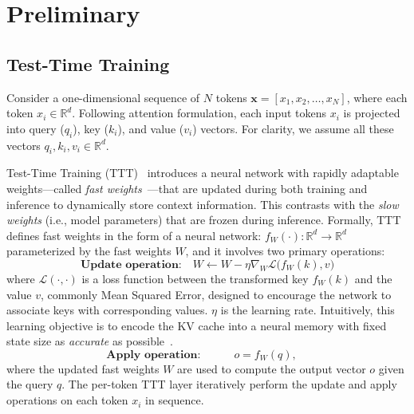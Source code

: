 \section{Preliminary} \label{sec:related}




\subsection{Test-Time Training}

Consider a one-dimensional sequence of $N$ tokens
$\mathbf{x} = [x_1, x_2, \dots, x_N]$, where each token $x_i \in \mathbb{R}^d$. 
Following attention formulation, 
each input tokens $x_i$ is projected into query ($q_i$), key ($k_i$), and value ($v_i$) vectors. 
For clarity, we assume all these vectors $q_i, k_i, v_i \in \mathbb{R}^d$.

Test-Time Training (TTT)~\cite{sun2024learning} introduces a neural network with rapidly adaptable weights---called \textit{fast weights}~\cite{schlag2021linear}---that are updated during 
both training and inference to dynamically store context information. 
This contrasts with the \textit{slow weights} (i.e., model parameters) that are frozen during inference.
Formally, TTT defines fast weights in the form of a neural network:
$f_W(\cdot): \mathbb{R}^d \rightarrow \mathbb{R}^d$ parameterized by the fast weights $W$,  and it involves two primary operations:
\begin{equation}
\textbf{Update operation:} \quad W \leftarrow W - \eta \nabla_{W} \mathcal{L}\big(f_W(k), v\big)
\label{eq:ttt_update}
\end{equation}
where $\mathcal{L}(\cdot,\cdot)$ is a loss function between the transformed key  $f_W(k)$ and the value $v$, commonly Mean Squared Error, designed to encourage the network to associate keys with corresponding values. 
$\eta$ is the learning rate.
Intuitively, this learning objective is to encode the KV cache into a neural memory with fixed state size as \emph{accurate} as possible~\cite{wang2025testtimeregressionunifyingframework}.
\begin{equation}
\textbf{Apply operation:}\quad \quad \quad
o = f_W(q),\quad 
\label{eq:ttt_apply}
\end{equation}
where the updated fast weights $W$ are used to compute the output vector $o$ given the query $q$.
The per-token TTT layer iteratively perform the update and apply operations on each token $x_i$ in sequence.




